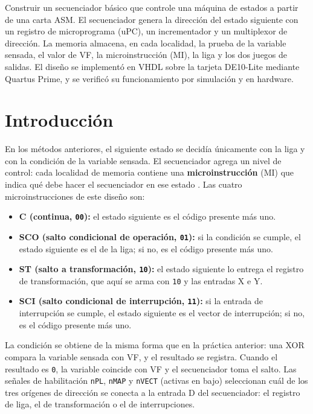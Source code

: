 Construir un secuenciador básico que controle una máquina de estados a partir de una carta ASM.
El secuenciador genera la dirección del estado siguiente con un registro de microprograma (uPC),
un incrementador y un multiplexor de dirección. La memoria almacena, en cada localidad, la prueba
de la variable sensada, el valor de VF, la microinstrucción (MI), la liga y los dos juegos de
salidas. El diseño se implementó en VHDL sobre la tarjeta DE10-Lite mediante Quartus Prime, y se
verificó su funcionamiento por simulación y en hardware.

\section{Introducción}

En los métodos anteriores, el siguiente estado se decidía únicamente con la liga y con la
condición de la variable sensada. El secuenciador agrega un nivel de control: cada localidad de
memoria contiene una \textbf{microinstrucción} (MI) que indica qué debe hacer el secuenciador en
ese estado \cite{savage}. Las cuatro microinstrucciones de este diseño son:

\begin{itemize}
  \item \textbf{C (continua, \texttt{00}):} el estado siguiente es el código presente más uno.
  \item \textbf{SCO (salto condicional de operación, \texttt{01}):} si la condición se cumple, el
  estado siguiente es el de la liga; si no, es el código presente más uno.
  \item \textbf{ST (salto a transformación, \texttt{10}):} el estado siguiente lo entrega el
  registro de transformación, que aquí se arma con \texttt{10} y las entradas X e Y.
  \item \textbf{SCI (salto condicional de interrupción, \texttt{11}):} si la entrada de
  interrupción se cumple, el estado siguiente es el vector de interrupción; si no, es el código
  presente más uno.
\end{itemize}

La condición se obtiene de la misma forma que en la práctica anterior: una XOR compara la variable
sensada con VF, y el resultado se registra. Cuando el resultado es \texttt{0}, la variable coincide
con VF y el secuenciador toma el salto. Las señales de habilitación \texttt{nPL}, \texttt{nMAP} y
\texttt{nVECT} (activas en bajo) seleccionan cuál de los tres orígenes de dirección se conecta a la
entrada D del secuenciador: el registro de liga, el de transformación o el de interrupciones.

